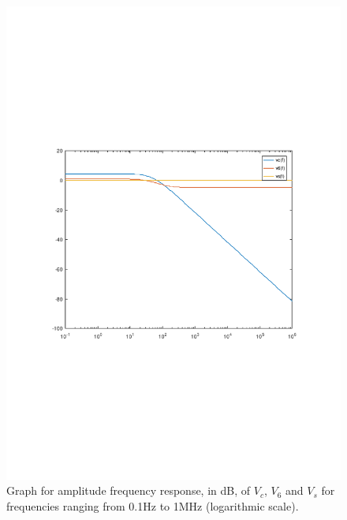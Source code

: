 \begin{figure}[H] \centering
\includegraphics[width=0.9\linewidth]{freq_resp_tab.pdf}
\caption{Graph for amplitude frequency response, in dB, of $V_c$, $V_6$ and $V_s$ for frequencies ranging from 0.1Hz to 1MHz (logarithmic scale).}
\label{fig:freq_resp}
\end{figure}



